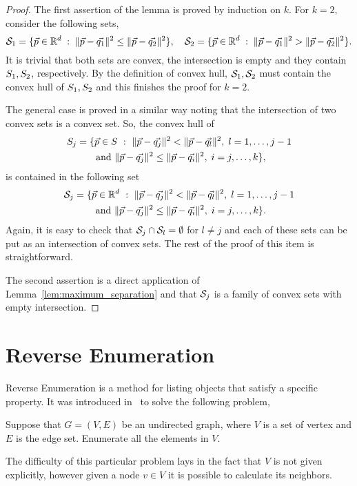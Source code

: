 \documentclass{article}
\begin{document}
\begin{proof}
  The first assertion of the lemma is proved by induction on $k$. For
  $k=2$, consider the following sets,
  \begin{equation*}
    \mathcal{S}_1 = \{\vec{p}\in\mathbb{R}^{d}\; :\;  \|\vec{p}-\vec{q_1}\|^2\le
    \|\vec{p}-\vec{q_2}\|^2\},\quad
     \mathcal{S}_2 = \{\vec{p}\in\mathbb{R}^{d}\; :\;  \|\vec{p}-\vec{q_1}\|^2>
    \|\vec{p}-\vec{q_2}\|^2\}.
  \end{equation*}
  It is trivial that both sets are convex, the intersection is empty
  and they contain 
  $S_1,S_2$, respectively. By the definition of convex hull,
  $\mathcal{S}_1,\mathcal{S}_2$ must contain the convex hull of
  $S_1,S_2$ and this finishes the proof for $k=2$.

  The general case is proved in a similar way  noting that the intersection
  of two convex sets is a convex set. So, the convex hull of 
  \begin{multline*}
  \Set_j=\{\vec{p}\in\Set\ :\ 
  \|\vec{p}-\vec{q_j}\|^2< \|\vec{p}-\vec{q_l}\|^2,\; l =1,\ldots, j-1\\
  \text{ and }
  \|\vec{p}-\vec{q_j}\|^2\le \|\vec{p}-\vec{q_i}\|^2,\; i =j,\ldots, k \},
  \end{multline*}
  is contained in the following set
  \begin{multline*}
    \mathcal{S}_j=\{\vec{p}\in\mathbb{R}^{d}\ :\
    \|\vec{p}-\vec{q_j}\|^2< \|\vec{p}-\vec{q_l}\|^2,\; l =1,\ldots, j-1\\
    \text{ and } \|\vec{p}-\vec{q_j}\|^2\le \|\vec{p}-\vec{q_i}\|^2,\;
    i =j,\ldots, k \}.
  \end{multline*}
  Again, it is easy to check that $\mathcal{S}_j\cap \mathcal{S}_l=\emptyset$ for
  $l\neq j$ and each of these sets can be put as an intersection of
  convex sets. The rest of the proof of this item is straightforward.

  The second assertion is a direct application of
  Lemma~\ref{lem:maximum_separation} and that $\mathcal{S}_j$ is a family of
  convex sets with empty intersection.
\end{proof}

\section{Reverse Enumeration}
\label{sec:reverse_enumeration}
Reverse Enumeration is a method for listing objects that satisfy a
specific property. It was introduced in~\cite{AvisFukuda} to solve
the following problem,
\begin{problem}
  \label{prob:traversal}
  Suppose that $G = (V, E)$ be an undirected graph, where $V$ is a set
  of vertex and $E$ is the edge set. Enumerate all the elements in $V$. 
\end{problem}
The difficulty of this particular problem lays in the fact that $V$
is  not given explicitly, however given a node $v\in V$ it is possible
to calculate its neighbors.
\end{document}
